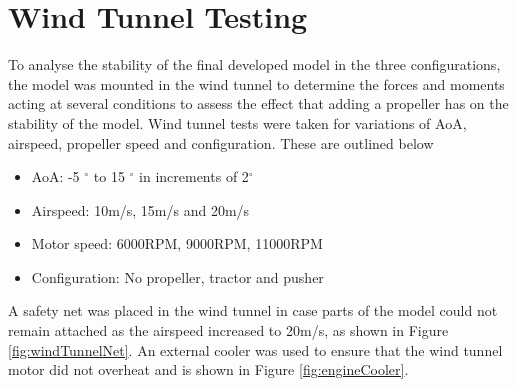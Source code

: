 \section{Wind Tunnel Testing}
To analyse the stability of the final developed model in the three configurations, the model was mounted in the wind tunnel to determine the forces and moments acting at several conditions to assess the effect that adding a propeller has on the stability of the model. Wind tunnel tests were taken for variations of AoA, airspeed, propeller speed and configuration. These are outlined below

\begin{itemize}
    \item AoA: -5 $^{\circ}$ to 15 $^{\circ}$ in increments of 2$^{\circ}$
    \item Airspeed: 10m/s, 15m/s and 20m/s
    \item Motor speed: 6000RPM, 9000RPM, 11000RPM
    \item Configuration: No propeller, tractor and pusher
\end{itemize}


A safety net was placed in the wind tunnel in case parts of the model could not remain attached as the airspeed increased to 20m/s, as shown in Figure \ref{fig:windTunnelNet}. An external cooler was used to ensure that the wind tunnel motor did not overheat and is shown in Figure \ref{fig:engineCooler}.


    


